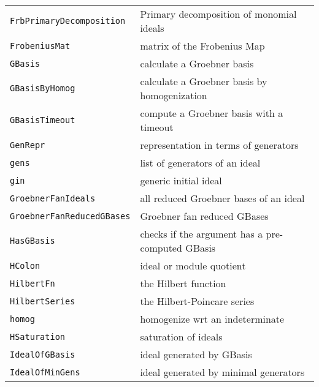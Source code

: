 \documentclass[a4paper]{mybook}
\begin{document}
\begin{center}
\begin{longtable}{ll}
{\verb~FrbPrimaryDecomposition~} &
      Primary decomposition of monomial ideals\\
   
{\verb~FrobeniusMat~} &
      matrix of the Frobenius Map\\
   
{\verb~GBasis~} &
      calculate a Groebner basis\\
   
{\verb~GBasisByHomog~} &
      calculate a Groebner basis by homogenization\\
   
{\verb~GBasisTimeout~} &
      compute a Groebner basis with a timeout\\
   
{\verb~GenRepr~} &
      representation in terms of generators\\
   
{\verb~gens~} &
      list of generators of an ideal\\
   
{\verb~gin~} &
      generic initial ideal\\
   
{\verb~GroebnerFanIdeals~} &
      all reduced Groebner bases of an ideal\\
   
{\verb~GroebnerFanReducedGBases~} &
      Groebner fan reduced GBases\\
   
{\verb~HasGBasis~} &
      checks if the argument has a pre-computed GBasis\\
   
{\verb~HColon~} &
      ideal or module quotient\\
   
{\verb~HilbertFn~} &
      the Hilbert function\\
   
{\verb~HilbertSeries~} &
      the Hilbert-Poincare series\\
   
{\verb~homog~} &
      homogenize wrt an indeterminate\\
   
{\verb~HSaturation~} &
      saturation of ideals\\
   
{\verb~IdealOfGBasis~} &
      ideal generated by GBasis\\
   
{\verb~IdealOfMinGens~} &
      ideal generated by minimal generators\\
   

\end{longtable}
\end{center}
\end{document}
